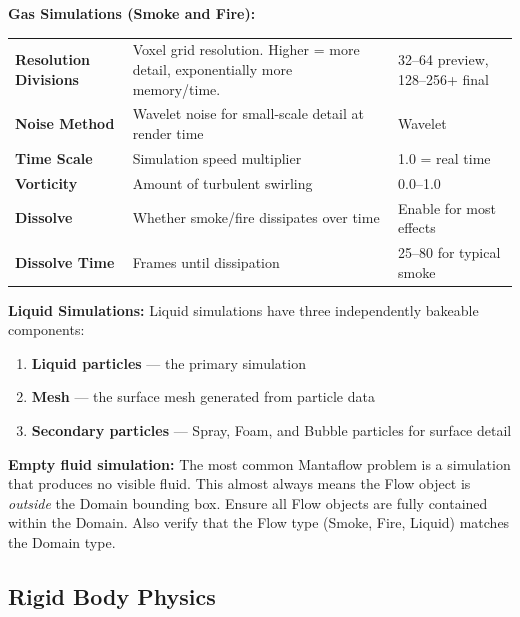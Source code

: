 \textbf{Gas Simulations (Smoke and Fire):}

\begin{center}
\begin{tabularx}{\textwidth}{L{3cm}L{5cm}X}
\toprule
{}
 &  &  \\
\midrule
\textbf{Resolution Divisions} & Voxel grid resolution. Higher = more detail, exponentially more memory/time. & 32--64 preview, 128--256+ final \\
\textbf{Noise Method} & Wavelet noise for small-scale detail at render time & Wavelet \\
\textbf{Time Scale} & Simulation speed multiplier & 1.0 = real time \\
\textbf{Vorticity} & Amount of turbulent swirling & 0.0--1.0 \\
\textbf{Dissolve} & Whether smoke/fire dissipates over time & Enable for most effects \\
\textbf{Dissolve Time} & Frames until dissipation & 25--80 for typical smoke \\
\bottomrule
\end{tabularx}
\end{center}

\textbf{Liquid Simulations:} Liquid simulations have three independently bakeable components:

\begin{enumerate}[leftmargin=2em]
  \item \textbf{Liquid particles} --- the primary simulation
  \item \textbf{Mesh} --- the surface mesh generated from particle data
  \item \textbf{Secondary particles} --- Spray, Foam, and Bubble particles for surface detail
\end{enumerate}

\begin{warningbox}
\textbf{Empty fluid simulation:} The most common Mantaflow problem is a simulation that produces no visible fluid. This almost always means the Flow object is \textit{outside} the Domain bounding box. Ensure all Flow objects are fully contained within the Domain. Also verify that the Flow type (Smoke, Fire, Liquid) matches the Domain type.
\end{warningbox}

\subsection{Rigid Body Physics}
\label{subsec:rigid-body}

